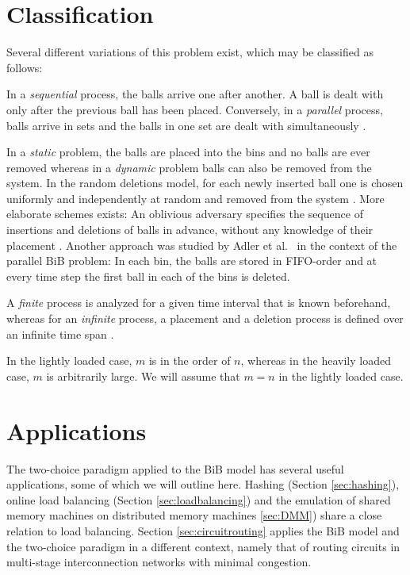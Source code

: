 \documentclass[a4paper,12pt]{article}
\begin{document}
\section{Classification}
\label{sec:classification}
Several different variations of this problem exist, which may be classified as follows:
\begin{compactitem}
\item In a \emph{sequential} process, the balls arrive one after another. A  ball is dealt with only after the previous ball has been placed. Conversely, in a \emph{parallel} process, balls arrive in sets and the balls in one set are dealt with simultaneously \cite{ABS98}. 
\item In a \emph{static} problem, the balls are placed into the bins and no balls are ever removed whereas in a \emph{dynamic} problem balls can also be removed from the system. In the random deletions model, for each newly inserted ball one is chosen uniformly and independently at random and removed from the system \cite{ABKU99} \cite{MRS01}. More elaborate schemes exists: An oblivious adversary specifies the sequence of insertions and deletions of balls in advance, without any knowledge of their placement \cite{CFM+98}. Another approach was studied by Adler et al.~\cite{ABS98} in the context of the parallel BiB problem: In each bin, the balls are stored in FIFO-order and at every time step the first ball in each of the bins is deleted. 
\item A \emph{finite} process is analyzed for a given time interval that is known beforehand, whereas for an \emph{infinite} process, a placement and a deletion process is defined over an infinite time span \cite{ABS98}.
\item In the lightly loaded case, $m$ is in the order of $n$, whereas in the heavily loaded case, $m$ is arbitrarily large. We will assume that $m = n$ in the lightly loaded case. 
\end{compactitem}

\section{Applications}
\label{sec:applications}
The two-choice paradigm applied to the BiB model has several useful applications, some of which we will outline here. Hashing (Section \ref{sec:hashing}), online load balancing (Section \ref{sec:loadbalancing}) and the emulation of shared memory machines on distributed memory machines \ref{sec:DMM}) share a close relation to load balancing. Section \ref{sec:circuitrouting} applies the BiB model and the two-choice paradigm in a different context, namely that of routing circuits in multi-stage interconnection networks with minimal congestion.
\end{document}
